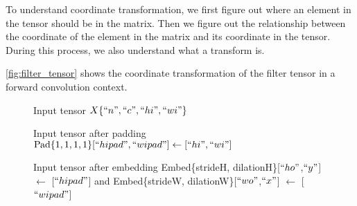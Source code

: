 To understand coordinate transformation, we first figure out where an element
in the tensor should be in the matrix.
Then we figure out the relationship between the coordinate of the element in the
matrix and its coordinate in the tensor.
During this process, we also understand what a transform is.

\Fig \ref{fig:filter_tensor} shows the coordinate transformation of the filter tensor
in a forward convolution context.

{}
\begin{figure}[!h]
  \centering
  \caption{Input tensor $X\{``n",``c",``hi",``wi"\}$}
  \label{fig:input_tensor}
\end{figure}

{}
\begin{figure}[!h]
  \centering
  \caption{Input tensor after padding $\text{Pad}\{1,1,1,1\}[``hipad",``wipad"] \leftarrow [``hi",``wi"]$}
  \label{fig:input_pad_tensor}
\end{figure}

\begin{figure}[!h]
  \centering
  \caption{Input tensor after embedding Embed\{strideH, dilationH\}[$``ho"$,$``y"$] $\leftarrow$ [$``hipad"$] and Embed\{strideW, dilationW\}[$``wo"$,$``x"$] $\leftarrow$ [$``wipad"$]}
  \label{fig:input_embed_tensor}
\end{figure}

